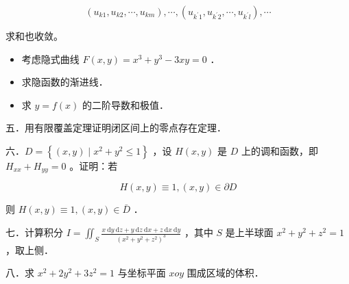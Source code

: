 \documentclass{article}
\begin{document}
\[
\left(u_{k 1}, u_{k 2}, \cdots, u_{k m}\right), \cdots,\left(u_{k^{\prime} 1}, u_{k^{\prime} 2}, \cdots, u_{k^{\prime} l}\right), \cdots
\]

求和也收敛。

\begin{itemize}
  \item[四．] 考虑隐式曲线 \(F(x,y)=x^{3}+y^{3}-3xy=0\) ．

  \item[1．] 求隐函数的渐进线．

  \item[2．] 求 \(y=f(x)\) 的二阶导数和极值．
\end{itemize}

五．用有限覆盖定理证明闭区间上的零点存在定理．

六．\(D=\left\{(x, y) \mid x^{2}+y^{2} \leq 1\right\}\) ，设 \(H(x, y)\) 是 \(D\) 上的调和函数，即 \(H_{x x}+H_{y y}=0\) 。证明：若

\[
H(x, y) \equiv 1,(x, y) \in \partial D
\]

则 \(H(x, y) \equiv 1,(x, y) \in \bar{D}\) ．

七．计算积分 \(I=\iint_{S} \frac{x \mathrm{~d} y \mathrm{~d} z+y \mathrm{~d} z \mathrm{~d} x+z \mathrm{~d} x \mathrm{~d} y}{\left(x^{2}+y^{2}+z^{2}\right)^{3}}\) ，其中 \(S\) 是上半球面 \(x^{2}+y^{2}+z^{2}=1\) ，取上侧．

八．求 \(x^{2}+2 y^{2}+3 z^{2}=1\) 与坐标平面 \(x o y\) 围成区域的体积．
\end{document}
